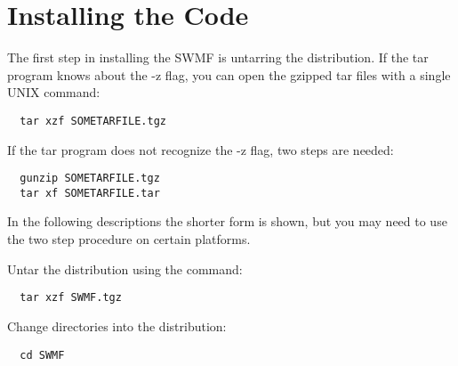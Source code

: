 \section{Installing the Code}

The first step in installing the SWMF is untarring the distribution.
If the tar program knows about the -z flag, you can open the gzipped
tar files with a single UNIX command:
\begin{verbatim}
  tar xzf SOMETARFILE.tgz
\end{verbatim}
If the tar program does not recognize the -z flag, two steps are needed:
\begin{verbatim}
  gunzip SOMETARFILE.tgz
  tar xf SOMETARFILE.tar
\end{verbatim}
In the following descriptions the shorter form is shown, but you may
need to use the two step procedure on certain platforms.

Untar the distribution using the command:
\begin{verbatim}
  tar xzf SWMF.tgz
\end{verbatim}

Change directories into the distribution:
\begin{verbatim}
  cd SWMF
\end{verbatim}

